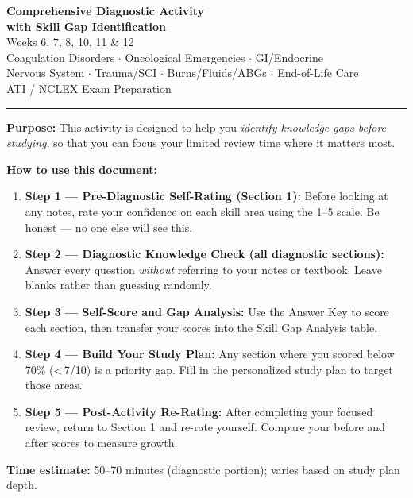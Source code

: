 \documentclass[11pt,letterpaper]{article}
\begin{document}

\begin{center}
  {\LARGE\bfseries Comprehensive Diagnostic Activity}\\[0.4cm]
  {\large\bfseries with Skill Gap Identification}\\[0.3cm]
  {\large Weeks 6, 7, 8, 10, 11 \& 12}\\[0.1cm]
  {\normalsize Coagulation Disorders $\cdot$ Oncological Emergencies $\cdot$ GI/Endocrine}\\
  {\normalsize Nervous System $\cdot$ Trauma/SCI $\cdot$ Burns/Fluids/ABGs $\cdot$ End-of-Life Care}\\[0.3cm]
  {\normalsize ATI / NCLEX Exam Preparation}\\[0.2cm]
  \rule{\linewidth}{0.6pt}
\end{center}

\vspace{0.3cm}

\begin{instructbox}
\textbf{Purpose:}  This activity is designed to help you \emph{identify knowledge gaps
before studying}, so that you can focus your limited review time where it matters most.

\bigskip
\textbf{How to use this document:}
\begin{enumerate}[leftmargin=1.5em]
  \item \textbf{Step 1 --- Pre-Diagnostic Self-Rating (Section 1):}  Before looking at any
        notes, rate your confidence on each skill area using the 1--5 scale.  Be honest ---
        no one else will see this.
  \item \textbf{Step 2 --- Diagnostic Knowledge Check (all diagnostic sections):}  Answer every
        question \emph{without} referring to your notes or textbook.  Leave blanks rather
        than guessing randomly.
  \item \textbf{Step 3 --- Self-Score and Gap Analysis:}  Use the Answer Key
        to score each section, then transfer your scores into the Skill Gap
        Analysis table.
  \item \textbf{Step 4 --- Build Your Study Plan:}  Any section where you
        scored below 70\% (\textless\,7/10) is a priority gap.  Fill in the personalized
        study plan to target those areas.
  \item \textbf{Step 5 --- Post-Activity Re-Rating:}  After completing your focused review,
        return to Section 1 and re-rate yourself.  Compare your before and after scores to
        measure growth.
\end{enumerate}

\bigskip
\textbf{Time estimate:}  50--70 minutes (diagnostic portion); varies based on study plan depth.
\end{instructbox}
\end{document}
